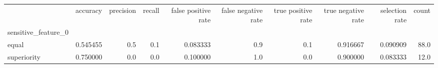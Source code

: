 \begin{tabular}{lrrrrrrrrr}
\toprule
{} &  accuracy &  precision &  recall &  false positive rate &  false negative rate &  true positive rate &  true negative rate &  selection rate &  count \\
sensitive\_feature\_0 &           &            &         &                      &                      &                     &                     &                 &        \\
\midrule
equal               &  0.545455 &        0.5 &     0.1 &             0.083333 &                  0.9 &                 0.1 &            0.916667 &        0.090909 &   88.0 \\
superiority         &  0.750000 &        0.0 &     0.0 &             0.100000 &                  1.0 &                 0.0 &            0.900000 &        0.083333 &   12.0 \\
\bottomrule
\end{tabular}
